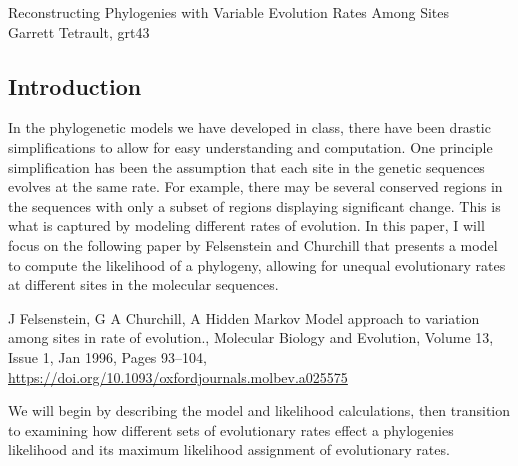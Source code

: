 \documentclass[12pt]{article}
\begin{document}
\begin{center}
    \Large{Reconstructing Phylogenies with Variable Evolution Rates Among Sites} \\
    \vspace{0.5cm}
    \normalsize{Garrett Tetrault, grt43}
\end{center}

\sectionline

\subsection*{Introduction}
    In the phylogenetic models we have developed in class, there have been drastic simplifications to allow for easy understanding and computation.
    One principle simplification has been the assumption that each site in the genetic sequences evolves at the same rate.
    For example, there may be several conserved regions in the sequences with only a subset of regions displaying significant change.
    This is what is captured by modeling different rates of evolution.
    In this paper, I will focus on the following paper by Felsenstein and Churchill
    that presents a model to compute the likelihood of a phylogeny,
    allowing for unequal evolutionary rates at different sites in the molecular sequences.
    \begin{adjustwidth}{1in}{1in}
        J Felsenstein, G A Churchill, 
        A Hidden Markov Model approach to variation among sites in rate of evolution., 
        Molecular Biology and Evolution, Volume 13, Issue 1, Jan 1996, Pages 93–104, \\
        \url{https://doi.org/10.1093/oxfordjournals.molbev.a025575}
    \end{adjustwidth}
    We will begin by describing the model and likelihood calculations, then transition to examining how different sets of evolutionary rates effect a phylogenies likelihood and its maximum likelihood assignment of evolutionary rates.
\end{document}
